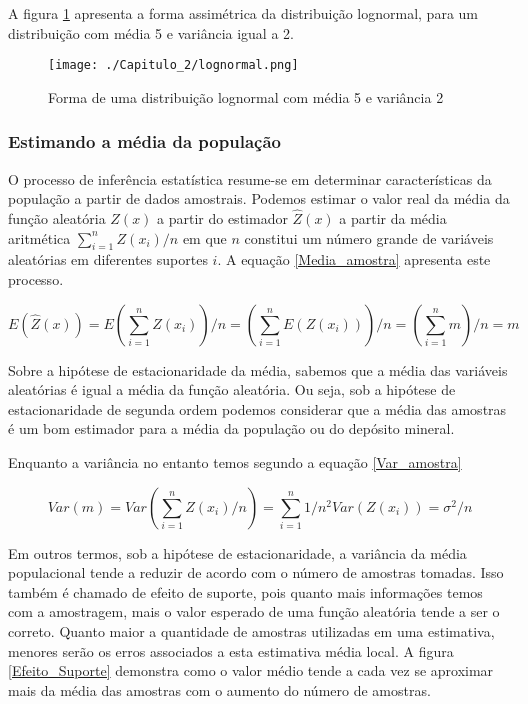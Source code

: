 A figura \ref{Fig_lognorm} apresenta a forma assimétrica da distribuição lognormal, para um distribuição com média 5 e variância igual a 2.

\FloatBarrier
\begin{figure}[!htb]
	\centering
	\texttt{[image: ./Capitulo\_2/lognormal.png]}	
	\caption{Forma de uma distribuição lognormal com média 5 e variância 2}
	\label{Fig_lognorm}
\end{figure}
\FloatBarrier



\subsubsection{Estimando a média da população }

O processo de inferência estatística resume-se em determinar características da população a partir de dados amostrais. Podemos estimar o valor real da média da função aleatória $Z(x)$ a partir do estimador $\hat{Z}(x)$ a partir  da média aritmética $\sum_{i=1}^{n} Z(x_{i})/n$  em que $n$ constitui um número grande de variáveis aleatórias em diferentes suportes $i$. A equação \eqref{Media_amostra} apresenta este processo. 

\begin{equation}\label{Media_amostra}
E(\hat{Z}(x)) = E\left(\sum_{i=1}^{n} Z(x_{i})\right)/n= \left(\sum_{i=1}^{n} E(Z(x_{i}))\right)/n = \left(\sum_{i=1}^{n} m\right)/n = m
\end{equation}

Sobre a hipótese de estacionaridade da média, sabemos que a média das variáveis aleatórias é igual a média da função aleatória. Ou seja, sob a hipótese de estacionaridade de segunda ordem podemos considerar que a média das amostras é um bom estimador para a média da população ou do depósito mineral. 

Enquanto a variância no entanto temos segundo a equação \eqref{Var_amostra}

\begin{equation}\label{Var_amostra}
Var(m) = Var\left(\sum_{i=1}^{n} Z(x_{i})/n\right) = \sum_{i=1}^{n} 1/n^2Var\left(Z(x_{i})\right)= \sigma^2/n
\end{equation}

Em outros termos, sob a hipótese de estacionaridade, a variância da média populacional tende a reduzir de acordo com o número de amostras tomadas. Isso também é chamado de efeito de suporte, pois quanto mais informações temos com a amostragem, mais o valor esperado de uma função aleatória tende a ser o correto. Quanto maior a quantidade de amostras utilizadas em uma estimativa, menores serão os erros associados a esta estimativa média local. A figura \eqref{Efeito_Suporte} demonstra como o valor médio tende a cada vez se aproximar mais da média das amostras com o aumento do número de amostras.

